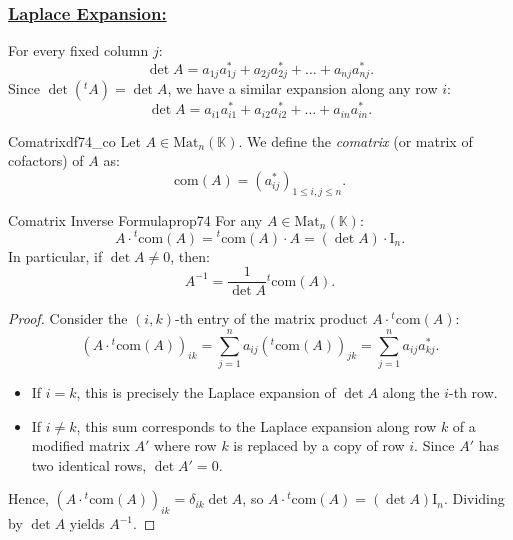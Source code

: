 \documentclass[11pt, a4paper]{article}
\newcommand{\K}{\mathbb{K}}
\begin{document}
\subsubsection*{\underline{Laplace Expansion:}}
For every fixed column $j$:
\[
  \det A = a_{1j} a_{1j}^* + a_{2j} a_{2j}^* + \dots + a_{nj} a_{nj}^*.
\]
Since $\det({}^t A) = \det A$, we have a similar expansion along any row $i$:
\[
  \det A = a_{i1} a_{i1}^* + a_{i2} a_{i2}^* + \dots + a_{in} a_{in}^*.
\]

\begin{definition}{Comatrix}{df74_co}
  Let $A \in \text{Mat}_n(\K)$. We define the \emph{comatrix} (or matrix of cofactors) of $A$ as:
  \[
    \text{com}(A) = (a_{ij}^*)_{1 \le i,j \le n}.
  \]
\end{definition}

\begin{proposition}{Comatrix Inverse Formula}{prop74}
  For any $A \in \text{Mat}_n(\K)$:
  \[
    A \cdot {}^t\text{com}(A) = {}^t\text{com}(A) \cdot A = (\det A) \cdot \text{I}_n.
  \]
  In particular, if $\det A \neq 0$, then:
  \[
    A^{-1} = \frac{1}{\det A} {}^t\text{com}(A).
  \]
\end{proposition}

\begin{proof}
  Consider the $(i, k)$-th entry of the matrix product $A \cdot {}^t\text{com}(A)$:
  \[
    \left( A \cdot {}^t\text{com}(A) \right)_{ik} = \sum_{j=1}^n a_{ij} ({}^t\text{com}(A))_{jk} = \sum_{j=1}^n a_{ij} a_{kj}^*.
  \]
  \begin{itemize}
    \item If $i = k$, this is precisely the Laplace expansion of $\det A$ along the $i$-th row.
    \item If $i \neq k$, this sum corresponds to the Laplace expansion along row $k$ of a modified matrix $A'$ where row $k$ is replaced by a copy of row $i$. Since $A'$ has two identical rows, $\det A' = 0$.
  \end{itemize}
  Hence, $\left( A \cdot {}^t\text{com}(A) \right)_{ik} = \delta_{ik} \det A$, so $A \cdot {}^t\text{com}(A) = (\det A) \text{I}_n$. Dividing by $\det A$ yields $A^{-1}$.
\end{proof}
\end{document}
